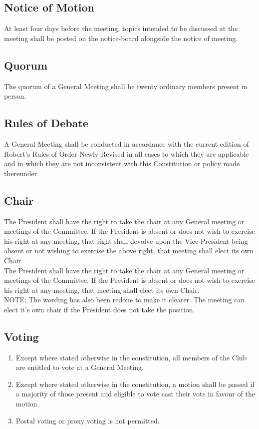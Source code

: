 \documentclass[11pt]{article} %
\begin{document}
\subsection{Notice of Motion}
At least four days before the meeting, topics intended to be discussed at the meeting shall be posted on the notice-board alongside the notice of meeting.

\subsection{Quorum}
The quorum of a General Meeting shall be twenty ordinary members present in person.

\subsection{Rules of Debate}
A General Meeting shall be conducted in accordance with the current edition of Robert’s Rules of Order Newly Revised in all cases to which they are applicable and in which they are not inconsistent with this Constitution or policy made thereunder.

\subsection{Chair}
{\color{red}The President shall have the right to take the chair at any General meeting or meetings of the Committee. If the President is absent or does not wish to exercise his right at any meeting, that right shall devolve upon the Vice-President being absent or not wishing to exercise the above right, that meeting shall elect its own Chair.}\\
{\color{ForestGreen}The President shall have the right to take the chair at any General meeting or meetings of the Committee. If the President is absent or does not wish to exercise his right at any meeting, that meeting shall elect its own Chair.}\\
{\color{Cyan}NOTE:
The wording has also been redone to make it clearer. The meeting can elect it's own chair if the President does not take the position.
}

\subsection{Voting}
\begin{enumerate}
	\item Except where stated otherwise in the constitution, all members of the Club are entitled to vote at a General Meeting.
	\item Except where stated otherwise in the constitution, a motion shall be passed if a majority of those present and eligible to vote cast their vote in favour of the motion.
	\item Postal voting or proxy voting is not permitted.
\end{enumerate}
\end{document}
